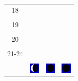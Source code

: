 \documentclass[twoside, a4paper,12pt, tikz]{scrartcl}
\begin{document}
\begin{tabularx}{\linewidth}{|c|X|X|X|}
        &   &       &    \\
      \hline
      18&   &       &    \\
        &   &       &    \\
      \hline
      19&   &       &    \\
        &   &       &    \\
      \hline
      20&   &       &    \\
        &   &       &    \\
      \hline
      21-24&   &       &    \\
        &   &       &    \\
      \hline  
      & \vspace{0.01cm} \centerline{\includegraphics[width=0.5cm]{moon_phases/Moon_phase_7.svg.png}} \vspace{0.1cm} & \vspace{0.01cm} \centerline{\includegraphics[width=0.5cm]{moon_phases/Moon_phase_0.svg.png}} \vspace{0.1cm} & \vspace{0.01cm} \centerline{\includegraphics[width=0.5cm]{moon_phases/Moon_phase_0.svg.png}} \vspace{0.1cm}\\
      \hline   
    \end{tabularx}




    \newpage

        \noindent
\end{document}
